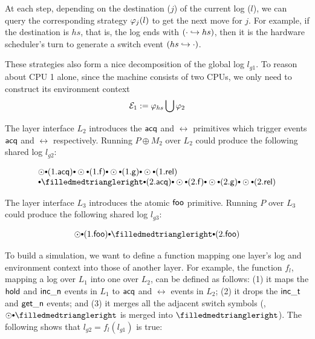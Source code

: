 At each step, depending on the destination ($j$) of the current log
($l$), we can query the corresponding strategy $\varphi_{j}(l)$ to get the
next move for $j$.  For example, if the destination is $hs$, that is,
the log ends with $(\cdot\hookrightarrow hs)$, then it is the
hardware scheduler's turn to generate a switch event $(hs\hookrightarrow \cdot)$.

These strategies also form a nice decomposition of the global log
$l_{g1}$. To reason about CPU 1 alone, since the machine consists of two CPUs, we only need to construct
its environment context $$\mathcal{E}_1 := \varphi_{hs} \bigcup \varphi_{2}$$

The layer interface $L_2$ introduces the $\mathsf{acq}$ and $\rel$ primitives
which trigger events $\mathsf{acq}$ and $\rel$ respectively. Running
$P\oplus{}M_2$ over $L_2$ could produce the following shared log $l_{g2}$:

\vspace*{-1ex}
\begin{small}
\[
\begin{array}{l}
\ssame \cons (1.\acq) \cons
\ssame \cons (1.\comm{f}) \cons
\ssame \cons (1.\comm{g}) \cons
\ssame \cons (1.\rel) 
\\
\cons \sdiff \cons (2.\acq) \cons
\ssame \cons (2.\comm{f}) \cons
\ssame \cons (2.\comm{g}) \cons
\ssame \cons (2.\rel) 
\end{array}
\]
\vspace{-5pt}
\end{small}%

The layer interface $L_3$ introduces the atomic $\mathsf{foo}$
primitive. Running $P$ over $L_3$ could produce the following shared log
$l_{g3}$:
\vspace*{-1ex}
\begin{small}
\[
\ssame \cons (1.\comm{foo})
\cons \sdiff \cons (2.\comm{foo})
\]
\vspace{-7pt}
\end{small}%

To build a simulation, we want to define a function mapping one
layer's log and environment context into those of another layer.  For
example, the function $f_l$, mapping a log over $L_1$ into one over
$L_2$, can be defined as follows: (1) it maps the $\mathsf{hold}$ and
$\mathsf{inc\_n}$ events in $L_1$ to $\mathsf{acq}$ and $\rel$ events in $L_2$; (2) it
drops the $\mathsf{inc\_t}$ and $\mathsf{get\_n}$ events; 
and (3) it merges all the adjacent switch symbols (\eg,
$\ssame \cons \sdiff$ is merged into $\sdiff$).
The following shows that $l_{g2} = f_l (l_{g1})$ is true:


